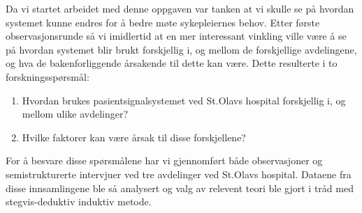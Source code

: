 \noindent
Da vi startet arbeidet med denne oppgaven var tanken at vi skulle se på hvordan systemet kunne endres for å bedre møte sykepleiernes behov. Etter første observasjonsrunde så vi imidlertid at en mer interessant vinkling ville være å se på hvordan systemet blir brukt forskjellig i, og mellom de forskjellige avdelingene, og hva de bakenforliggende årsakende til dette kan være. Dette resulterte i to forskningsspørsmål:

\begin{enumerate}
\item Hvordan brukes pasientsignalsystemet ved St.Olavs hospital forskjellig i, og mellom ulike avdelinger? 
\item Hvilke faktorer kan være årsak til disse forskjellene?
\end{enumerate}

\noindent
For å besvare disse spørsmålene har vi gjennomført både observasjoner og semistrukturerte intervjuer ved tre avdelinger ved St.Olavs hospital. Dataene fra disse innsamlingene ble så analysert og valg av relevent teori ble gjort i tråd med stegvis-deduktiv induktiv metode.
